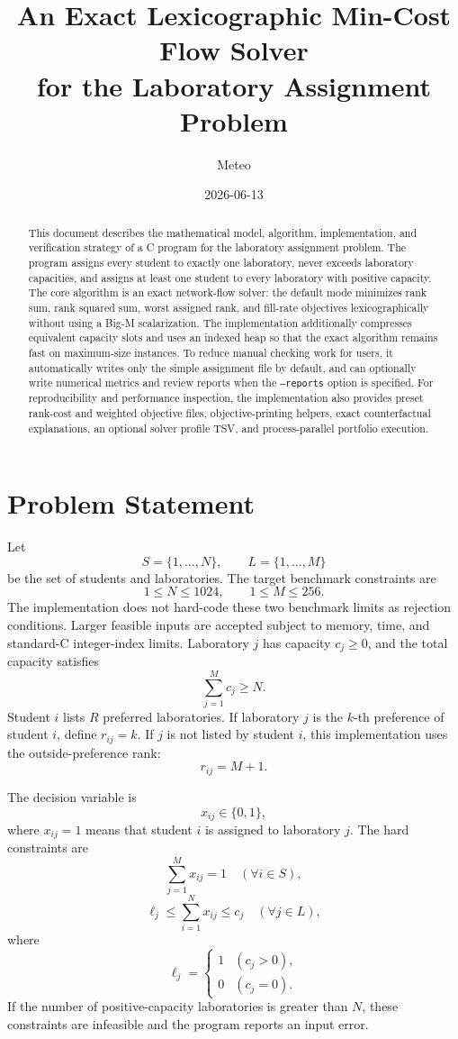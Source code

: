 \documentclass[11pt,a4paper]{article}
\title{An Exact Lexicographic Min-Cost Flow Solver\\
for the Laboratory Assignment Problem}
\author{Meteo}
\date{2026-06-13}
\begin{document}
\maketitle

\begin{abstract}
This document describes the mathematical model, algorithm, implementation,
and verification strategy of a C program for the laboratory assignment
problem.  The program assigns every student to exactly one laboratory, never
exceeds laboratory capacities, and assigns at least one student to every
laboratory with positive capacity.  The core algorithm is an exact
network-flow solver: the default mode minimizes rank sum, rank squared sum,
worst assigned rank, and fill-rate objectives lexicographically without using a
Big-M scalarization.  The implementation additionally compresses equivalent
capacity slots and uses an indexed heap so that the exact algorithm remains
fast on maximum-size instances.  To reduce manual checking work for users, it
automatically writes only the simple assignment file by default, and can
optionally write numerical metrics and review reports when the
\texttt{--reports} option is specified.  For reproducibility and performance
inspection, the implementation also provides preset rank-cost and weighted
objective files, objective-printing helpers, exact counterfactual
explanations, an optional solver profile TSV, and process-parallel portfolio
execution.
\end{abstract}

\section{Problem Statement}

Let
\[
  S=\{1,\ldots,N\}, \qquad L=\{1,\ldots,M\}
\]
be the set of students and laboratories.  The target benchmark constraints are
\[
  1 \leq N \leq 1024, \qquad 1 \leq M \leq 256.
\]
The implementation does not hard-code these two benchmark limits as rejection
conditions.  Larger feasible inputs are accepted subject to memory, time, and
standard-C integer-index limits.
Laboratory \(j\) has capacity \(c_j \geq 0\), and the total capacity satisfies
\[
  \sum_{j=1}^{M} c_j \geq N.
\]
Student \(i\) lists \(R\) preferred laboratories.  If laboratory \(j\) is the
\(k\)-th preference of student \(i\), define \(r_{ij}=k\).  If \(j\) is not
listed by student \(i\), this implementation uses the outside-preference rank:
\[
  r_{ij}=M+1.
\]

The decision variable is
\[
  x_{ij} \in \{0,1\},
\]
where \(x_{ij}=1\) means that student \(i\) is assigned to laboratory \(j\).
The hard constraints are
\[
  \sum_{j=1}^{M} x_{ij} = 1 \quad (\forall i\in S),
\]
\[
  \ell_j \leq \sum_{i=1}^{N} x_{ij} \leq c_j \quad (\forall j\in L),
\]
where
\[
  \ell_j =
  \begin{cases}
    1 & (c_j>0),\\
    0 & (c_j=0).
  \end{cases}
\]
If the number of positive-capacity laboratories is greater than \(N\), these
constraints are infeasible and the program reports an input error.
\end{document}
